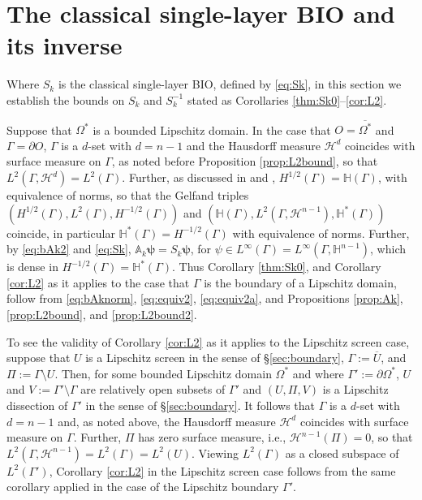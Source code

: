 \documentclass{birkjour}
\theoremstyle{definition}
\theoremstyle{remark}
\numberwithin{equation}{section}
\newcommand{\cH}{\mathcal{H}}
\newcommand{\bA}{\mathbb{A}}
\newcommand{\bH}{\mathbb{H}}
\newcommand{\bpsi}{\boldsymbol{\psi}}
\begin{document}
\section{The classical single-layer BIO and its inverse} \label{sec:slp2}
Where $S_k$ is the classical single-layer BIO, defined by \eqref{eq:Sk},  in this section we establish the bounds on $S_k$ and $S_k^{-1}$ stated as Corollaries \ref{thm:Sk0}--\ref{cor:L2}.

Suppose that $\Omega^{*}$ is a bounded Lipschitz domain. In the case that $O=\overline{\Omega^{*}}$ and $\Gamma = \partial O$, $\Gamma$ is a $d$-set with $d=n-1$ and the Hausdorff measure $\cH^d$ coincides with surface measure on $\Gamma$, as noted before Proposition \ref{prop:L2bound}, so that $L^2(\Gamma,\cH^d)=L^2(\Gamma)$. Further, as discussed in \cite[Remark 3.10]{caetano2025integral} and \cite[Remark 3.6]{caetano2021}, $H^{1/2}(\Gamma)=\bH(\Gamma)$, with equivalence of norms, so that the Gelfand triples $(H^{1/2}(\Gamma),L^2(\Gamma),H^{-1/2}(\Gamma))$ and $(\bH(\Gamma),L^2(\Gamma,\cH^{n-1}),\bH^*(\Gamma))$ coincide, in particular $\bH^*(\Gamma)=H^{-1/2}(\Gamma)$ with equivalence of norms. Further, by \eqref{eq:bAk2} and \eqref{eq:Sk}, $\bA_k\bpsi=S_k\bpsi$, for $\psi\in L^\infty(\Gamma)=L^\infty(\Gamma,\bH^{n-1})$, which is dense in $H^{-1/2}(\Gamma)=\bH^*(\Gamma)$. Thus Corollary \ref{thm:Sk0}, and Corollary \ref{cor:L2} as it applies to the case that $\Gamma$ is the boundary of a Lipschitz domain, follow from \eqref{eq:bAknorm}, \eqref{eq:equiv2}, \eqref{eq:equiv2a}, and Propositions \ref{prop:Ak}, \ref{prop:L2bound}, and \ref{prop:L2bound2}. 

To see the validity of Corollary \ref{cor:L2} as it applies to the Lipschitz screen case, suppose that $U$ is a Lipschitz screen in the sense of \S\ref{sec:boundary}, $\Gamma:= \overline{U}$, and $\Pi := \Gamma \setminus U$. Then, for some bounded Lipschitz domain $\Omega^{*}$ and where $\Gamma':= \partial \Omega^{*}$, $U$ and $V:= \Gamma'\setminus \Gamma$ are relatively open subsets of $\Gamma'$ and $(U,\Pi,V)$ is a Lipschitz dissection of $\Gamma'$ in the sense of \S\ref{sec:boundary}. It follows that $\Gamma$ is a $d$-set with $d=n-1$ and, as noted above, the Hausdorff measure $\cH^d$ coincides with surface measure on $\Gamma$. Further, $\Pi$ has zero surface measure, i.e., $\cH^{n-1}(\Pi)=0$, so that $L^2(\Gamma, \cH^{n-1})=L^2(\Gamma)=L^2(U)$. Viewing $L^2(\Gamma)$ as a closed subspace of $L^2(\Gamma')$, Corollary \ref{cor:L2} in the Lipschitz screen case follows from  the same corollary applied in the case of the Lipschitz boundary $\Gamma'$.
\end{document}
